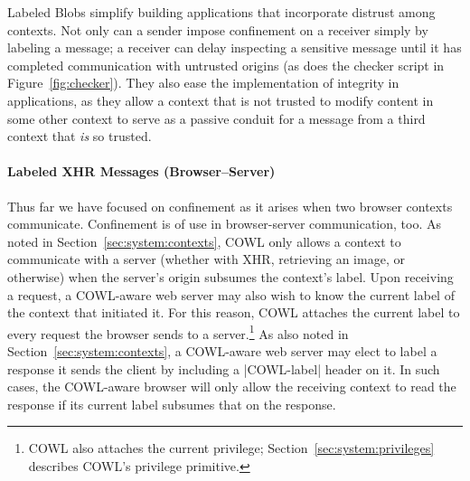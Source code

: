 Labeled Blobs simplify building applications that incorporate distrust
among contexts. Not only can a sender impose confinement on a receiver
simply by labeling a message; a receiver can delay inspecting a
sensitive message until it has completed communication with untrusted
origins (as does the checker script in Figure~\ref{fig:checker}). They
also ease the implementation of integrity in applications, as they
allow a context that is not trusted to modify content in some other
context to serve as a passive conduit for a message from a third
context that {\em is} so trusted.
%
%
%
%
%
%

\paragraph{Labeled XHR Messages (Browser--Server)}
\label{sec:system:labeled-xhr}
Thus far we have focused on confinement as it arises when two browser
contexts communicate. Confinement is of use in browser-server
communication, too. As noted in Section~\ref{sec:system:contexts},
COWL only allows a context to communicate with a server (whether with
XHR, retrieving an image, or otherwise) when the server's origin
subsumes the context's label. Upon receiving a request, a COWL-aware
web server may also wish to know the current label of the context that
initiated it. For this reason, COWL attaches the current label to
every request the browser sends to a server.\footnote{COWL also
  attaches the current privilege; Section~\ref{sec:system:privileges}
  describes COWL's privilege primitive.} As also noted in
Section~\ref{sec:system:contexts}, a COWL-aware web server may elect
to label a response it sends the client by including a \js|COWL-label|
header on it. In such cases, the COWL-aware browser will only allow
the receiving context to read the response if its current label
subsumes that on the response.

